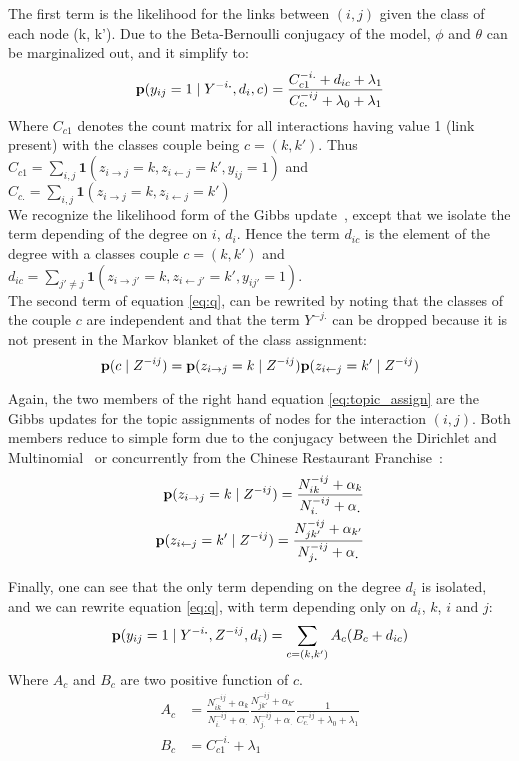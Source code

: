 \documentclass[a4paper, 12pt]{article}
\begin{document}
The first term is the likelihood for the links between $(i,j)$ given the class of each node (k, k'). Due to the Beta-Bernoulli conjugacy of the model, $\phi$ and $\theta$ can be marginalized out, and it simplify to: 
\begin{equation} \label{eq:qc}
\mathbf{p}(y_{ij}=1 \mid Y^{-i\bm{.}}, d_i , c) = \frac{C_{c1}^{-i.} + d_{ic} + \lambda_1}{C_{c\bm{.}}^{-ij} + \lambda_0+\lambda_1} 
\end{equation}
Where $C_{c1}$ denotes the count matrix for all interactions having value 1 (link present) with the classes couple being $c=(k, k')$. Thus $C_{c1} = \sum_{i,j} \bm{1}(z_{i\rightarrow j}=k, z_{i\leftarrow j}=k', y_{ij}=1)$ and $C_{c.} = \sum_{i,j} \bm{1}(z_{i\rightarrow j}=k, z_{i\leftarrow j}=k')$\\

We recognize the likelihood form of the Gibbs update~\cite{HDP}, except that we isolate the term depending of the degree on $i$, $d_i$. Hence the term $d_{ic}$ is the element of the degree with a classes couple $c=(k,k')$ and $d_{ic} = \sum_{j' \neq j} \bm{1}(z_{i\rightarrow j'}=k, z_{i\leftarrow j'}=k', y_{ij'}=1) $.\\

The second term of equation \eqref{eq:q}, can be rewrited by noting that the classes of the couple $c$ are independent and that the term $Y^{-j\bm{.}}$ can be dropped because it is not present in the Markov blanket of the class assignment: 
\begin{equation} \label{eq:topic_assign}
\mathbf{p}(c \mid  Z^{-ij} ) =  \mathbf{p}(z_{i\rightarrow j}=k \mid Z^{-ij}) \mathbf{p}(z_{i\leftarrow j}=k' \mid Z^{-ij})
\end{equation}

Again, the two members of the right hand equation \eqref{eq:topic_assign} are the Gibbs updates for the topic assignments of nodes for the interaction $(i,j)$. Both members reduce to simple form due to the conjugacy between the Dirichlet and Multinomial~\cite{DM} or concurrently from the Chinese Restaurant Franchise~\cite{HDP}:
\begin{align}
\mathbf{p}(z_{i\rightarrow j}=k \mid Z^{-ij}) = \frac{N_{ik}^{-ij} + \alpha_k}{ N_{i.}^{-ij} + \alpha_{\bm{.}} } \\
\mathbf{p}(z_{i\leftarrow j}=k' \mid Z^{-ij}) = \frac{N_{jk'}^{-ij} + \alpha_{k'}}{ N_{j\bm{.}}^{-ij} + \alpha_{\bm{.}} } 
\end{align}

Finally, one can see that the only term depending on the degree $d_i$ is isolated, and we can rewrite equation \eqref{eq:q}, with term depending only on $d_i$, $k$, $i$ and $j$:
\begin{equation}
\mathbf{p}(y_{ij}=1 \mid Y^{-i\bm{.}}, Z^{-ij}, d_i ) = \sum_{c=(k, k')} A_c (B_c + d_{ic})
\end{equation}
Where $A_c$ and $B_c$ are two positive function of $c$.
\begin{align}
A_c &= \frac{N_{ik}^{-ij} + \alpha_k}{ N_{i.}^{-ij} + \alpha_{\bm{.}} } \frac{N_{jk'}^{-ij} + \alpha_{k'}}{ N_{j\bm{.}}^{-ij} + \alpha_{\bm{.}} } \frac{1}{C_{c\bm{.}}^{-ij} + \lambda_0+\lambda_1} \\
B_c &= C_{c1}^{-i.} + \lambda_1
\end{align}
\end{document}
